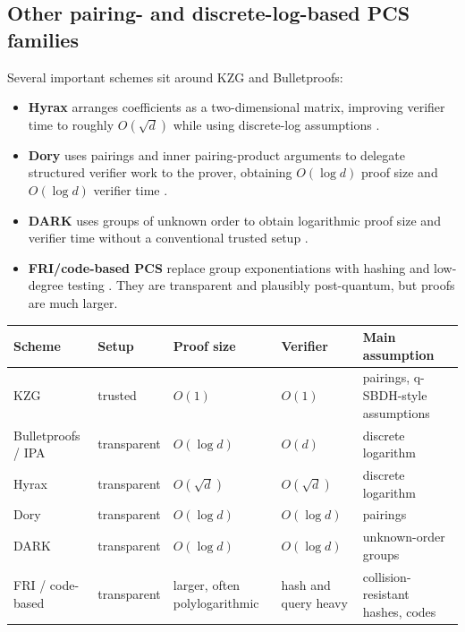 \documentclass[11pt]{article}
\begin{document}
\subsection{Other pairing- and discrete-log-based PCS families}

Several important schemes sit around KZG and Bulletproofs:
\begin{itemize}[leftmargin=2em]
    \item \textbf{Hyrax} arranges coefficients as a two-dimensional matrix, improving verifier time to roughly $O(\sqrt d)$ while using discrete-log assumptions \cite{WahbyTziallaShelatThalerWalfish2018}.
    \item \textbf{Dory} uses pairings and inner pairing-product arguments to delegate structured verifier work to the prover, obtaining $O(\log d)$ proof size and $O(\log d)$ verifier time \cite{Lee2021Dory}.
    \item \textbf{DARK} uses groups of unknown order to obtain logarithmic proof size and verifier time without a conventional trusted setup \cite{BunzFischSzepieniec2020DARK}.
    \item \textbf{FRI/code-based PCS} replace group exponentiations with hashing and low-degree testing \cite{BenSassonBentovHoreshRiabzev2018FRI}. They are transparent and plausibly post-quantum, but proofs are much larger.
\end{itemize}

\begin{center}
\begin{tabular}{>{\raggedright\arraybackslash}p{2.5cm} >{\raggedright\arraybackslash}p{2.4cm} >{\raggedright\arraybackslash}p{2.4cm} >{\raggedright\arraybackslash}p{2.4cm} >{\raggedright\arraybackslash}p{3.0cm}}
\toprule
Scheme & Setup & Proof size & Verifier & Main assumption \\
\midrule
KZG & trusted & $O(1)$ & $O(1)$ & pairings, q-SBDH-style assumptions \\
Bulletproofs / IPA & transparent & $O(\log d)$ & $O(d)$ & discrete logarithm \\
Hyrax \cite{WahbyTziallaShelatThalerWalfish2018} & transparent & $O(\sqrt d)$ & $O(\sqrt d)$ & discrete logarithm \\
Dory \cite{Lee2021Dory} & transparent & $O(\log d)$ & $O(\log d)$ & pairings \\
DARK \cite{BunzFischSzepieniec2020DARK} & transparent & $O(\log d)$ & $O(\log d)$ & unknown-order groups \\
FRI / code-based & transparent & larger, often polylogarithmic & hash and query heavy & collision-resistant hashes, codes \\
\bottomrule
\end{tabular}
\end{center}
\end{document}
